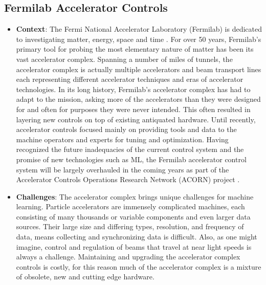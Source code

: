 \subsection{Fermilab Accelerator Controls}
    \begin{itemize}
        \item \textbf{Context}: 
            The Fermi National Accelerator Laboratory (Fermilab) is dedicated to investigating matter, energy, space and time \cite{fermilab_about}. For over 50 years, Fermilab's primary tool for probing the most elementary nature of matter has been its vast accelerator complex. Spanning a number of miles of tunnels, the accelerator complex is actually multiple accelerators and beam transport lines each representing different accelerator techniques and eras of accelerator technologies. In its long history, Fermilab's accelerator complex has had to adapt to the mission, asking more of the accelerators than they were designed for and often for purposes they were never intended. This often resulted in layering new controls on top of existing antiquated hardware. Until recently, accelerator controls focused mainly on providing tools and data to the machine operators and experts for tuning and optimization. Having recognized the future inadequacies of the current control system and the promise of new technologies such as ML, the Fermilab accelerator control system will be largely overhauled in the coming years as part of the Accelerator Controls Operations Research Network (ACORN) project \cite{acorn_paper}. 
        \item \textbf{Challenges}: 
            The accelerator complex brings unique challenges for machine learning. Particle accelerators are immensely complicated machines, each consisting of many thousands or variable components and even larger data sources. Their large size and differing types, resolution, and frequency of data, means collecting and synchronizing data is difficult. Also, as one might imagine, control and regulation of beams  that travel at near light speeds is always a challenge. Maintaining and upgrading the accelerator complex controls is costly, for this reason much of the accelerator complex is a mixture of obsolete, new and cutting edge hardware. 

\end{itemize}
